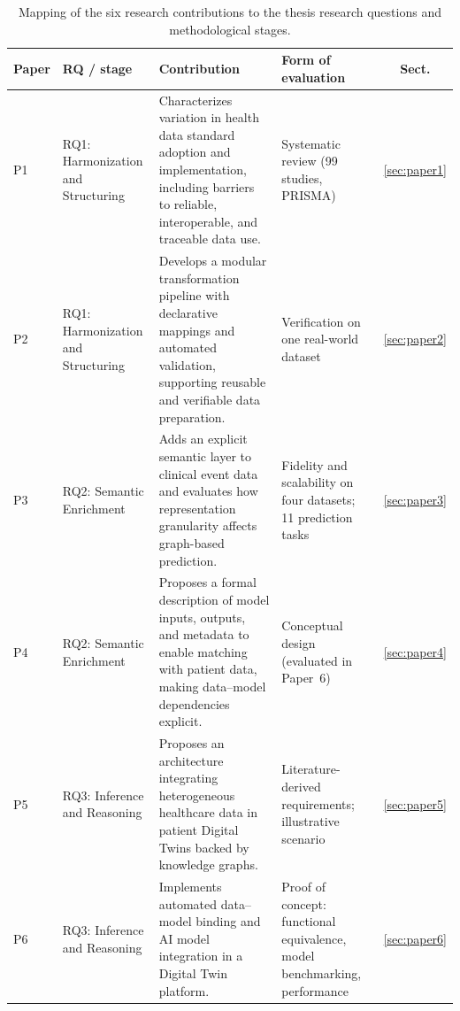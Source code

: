 \begin{table}[htpb]
\caption{Mapping of the six research contributions to the thesis research questions and methodological stages.}
\label{tab:article_contributions}
\small
\begin{tabularx}{\textwidth}{@{}>{\raggedright\arraybackslash}p{1.9cm} >{\raggedright\arraybackslash}p{2.3cm} >{\raggedright\arraybackslash}X >{\raggedright\arraybackslash}p{3.0cm} c@{}}
\toprule
\textbf{Paper} & \textbf{RQ / stage} & \textbf{Contribution} & \textbf{Form of evaluation} & \textbf{Sect.} \\
\midrule
P1\newline\cite{marfoglia2026challenges} & RQ1: Harmonization and Structuring & Characterizes variation in health data standard adoption and implementation, including barriers to reliable, interoperable, and traceable data use. & Systematic review (99 studies, PRISMA) & \ref{sec:paper1} \\
\addlinespace
P2\newline\cite{marfoglia_towards_2025} & RQ1: Harmonization and Structuring & Develops a modular transformation pipeline with declarative mappings and automated validation, supporting reusable and verifiable data preparation. & Verification on one real-world dataset & \ref{sec:paper2} \\
\addlinespace
P3\newline\cite{marfoglia_meds-owl_2026} & RQ2: Semantic Enrichment & Adds an explicit semantic layer to clinical event data and evaluates how representation granularity affects graph-based prediction. & Fidelity and scalability on four datasets; 11 prediction tasks & \ref{sec:paper3} \\
\addlinespace
P4\newline\cite{marfoglia_2024_mimo} & RQ2: Semantic Enrichment & Proposes a formal description of model inputs, outputs, and metadata to enable matching with patient data, making data--model dependencies explicit. & Conceptual design (evaluated in Paper~6) & \ref{sec:paper4} \\
\addlinespace
P5\newline\cite{10.3389/fdgth.2023.1322428_carbonaro_connected} & RQ3: Inference and Reasoning & Proposes an architecture integrating heterogeneous healthcare data in patient Digital Twins backed by knowledge graphs. & Literature-derived requirements; illustrative scenario & \ref{sec:paper5} \\
\addlinespace
P6\newline\cite{MARFOGLIA2026108380} & RQ3: Inference and Reasoning & Implements automated data--model binding and AI model integration in a Digital Twin platform. & Proof of concept: functional equivalence, model benchmarking, performance & \ref{sec:paper6} \\
\bottomrule
\end{tabularx}
\end{table}

